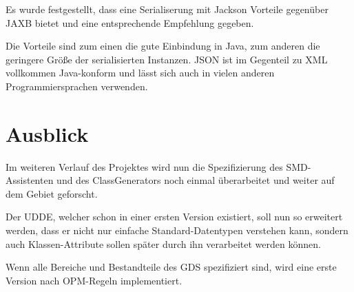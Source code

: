 % 

Es wurde festgestellt, dass eine Serialiserung mit Jackson Vorteile gegen\"uber JAXB bietet und eine entsprechende Empfehlung gegeben. 

Die Vorteile sind zum einen die gute Einbindung in Java, zum anderen die geringere Gr\"o\ss{}e der serialisierten Instanzen. \ac{JSON} ist im Gegenteil zu XML vollkommen Java-konform und l\"asst sich auch in vielen anderen Programmiersprachen verwenden. 
\section{Ausblick}
Im weiteren Verlauf des Projektes wird nun die Spezifizierung des \ac{SMD}-Assistenten und des ClassGenerators noch einmal \"uberarbeitet und weiter auf dem Gebiet geforscht. 

Der \ac{UDDE}, welcher schon in einer ersten Version existiert, soll nun so erweitert werden, dass er nicht nur einfache Standard-Datentypen verstehen kann, sondern auch Klassen-Attribute sollen sp\"ater durch ihn verarbeitet werden k\"onnen.

Wenn alle Bereiche und Bestandteile des \ac{GDS} spezifiziert sind, wird eine erste Version nach \ac{OPM}-Regeln implementiert.